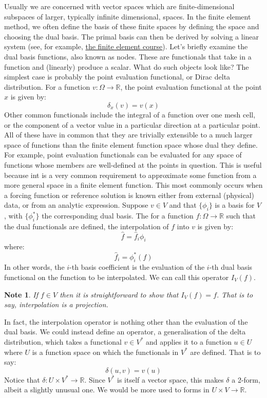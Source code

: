 \documentclass[a4paper,11pt]{article}
\newtheorem{note}{Note}[section]
\begin{document}
Usually we are concerned with vector spaces which are finite-dimensional subspaces of larger, typically infinite dimensional, spaces. In the finite element method, we often define the basis of these finite spaces by defining the space and choosing the dual basis. The primal basis can then be derived by solving a linear system (see, for example, \href{https://finite-element.github.io/2_finite_elements.html}{the finite element course}). Let's briefly examine the dual basis functions, also known as nodes. These are functionals that take in a function and (linearly) produce a scalar. What do such objects look like? The simplest case is probably the point evaluation functional, or Dirac delta distribution. For a function $v: \Omega\rightarrow\mathbb{R}$, the point evaluation functional at the point $x$ is given by:
\begin{equation}
    \delta_x(v) = v(x)
\end{equation}
Other common functionals include the integral of a function over one mesh cell, or the component of a vector value in a particular direction at a particular point. All of these have in common that they are trivially extensible to a much larger space of functions than the finite element function space whose dual they define. For example, point evaluation functionals can be evaluated for any space of functions whose members are well-defined at the points in question. This is useful because int is a very common requirement to approximate some function from a more general space in a finite element function. This most commonly occurs when a forcing function or reference solution is known either from external (physical) data, or from an analytic expression. Suppose $v\in V$ and that $\{\phi_i\}$ is a basis for $V$, with $\{\phi_i^*\}$ the corresponding dual basis. The for a function $f:\Omega\rightarrow\mathbb{R}$ such that the dual functionals are defined, the interpolation of $f$ into $v$ is given by:
\begin{equation}
    \hat{f} = \hat{f}_i \phi_i 
\end{equation}
where:
\begin{equation}
    \hat{f}_i = \phi_i^*(f)
\end{equation}
In other words, the $i$-th basis coefficient is the evaluation of the $i$-th dual basis functional on the function to be interpolated. We can call this operator $I_V(f)$.
\begin{note}
    If $f\in V$ then it is straightforward to show that $I_V(f)=f$. That is to say, interpolation is a projection.
\end{note}
In fact, the interpolation operator is nothing other than the evaluation of the dual basis. We could instead define an operator, a generalisation of the delta distribution, which takes a functional $v\in V^*$ and applies it to a function $u\in U$ where $U$ is a function space on which the functionals in $V^*$ are defined. That is to say:
\begin{equation}
    \delta(u, v) = v(u)
\end{equation}
Notice that $\delta: U\times V^*\rightarrow \mathbb{R}$. Since $V^*$ is itself a vector space, this makes $\delta$ a 2-form, albeit a slightly unusual one. We would be more used to forms in $U\times V\rightarrow\mathbb{R}$.
\end{document}
